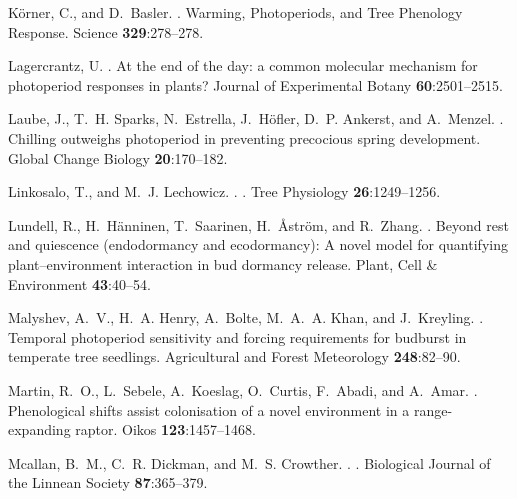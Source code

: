 \documentclass{article}
\begin{document}
\begin{thebibliography}{131}
K{\"o}rner, C., and D.~Basler.
.
\newblock Warming, Photoperiods, and Tree Phenology Response.
\newblock Science {\bf 329}:278--278.

Lagercrantz, U.
.
\newblock At the end of the day: a common molecular mechanism for photoperiod
  responses in plants?
\newblock Journal of Experimental Botany {\bf 60}:2501--2515.

Laube, J., T.~H. Sparks, N.~Estrella, J.~H{\"o}fler, D.~P. Ankerst, and
  A.~Menzel.
.
\newblock Chilling outweighs photoperiod in preventing precocious spring
  development.
\newblock Global Change Biology {\bf 20}:170--182.

Linkosalo, T., and M.~J. Lechowicz.
.
.
\newblock Tree Physiology {\bf 26}:1249--1256.

Lundell, R., H.~H{\"a}nninen, T.~Saarinen, H.~{\AA}str{\"o}m, and R.~Zhang.
.
\newblock Beyond rest and quiescence (endodormancy and ecodormancy): A novel
  model for quantifying plant--environment interaction in bud dormancy release.
\newblock Plant, Cell \& Environment {\bf 43}:40--54.

Malyshev, A.~V., H.~A. Henry, A.~Bolte, M.~A.~A. Khan, and J.~Kreyling.
.
\newblock Temporal photoperiod sensitivity and forcing requirements for
  budburst in temperate tree seedlings.
\newblock Agricultural and Forest Meteorology {\bf 248}:82--90.

Martin, R.~O., L.~Sebele, A.~Koeslag, O.~Curtis, F.~Abadi, and A.~Amar.
.
\newblock Phenological shifts assist colonisation of a novel environment in a
  range-expanding raptor.
\newblock Oikos {\bf 123}:1457--1468.

Mcallan, B.~M., C.~R. Dickman, and M.~S. Crowther.
.
.
\newblock Biological Journal of the Linnean Society {\bf 87}:365--379.


\end{thebibliography}
\end{document}
